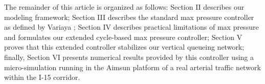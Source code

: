 


The remainder of this article is organized as follows: Section II describes our modeling framework; Section III describes the standard max pressure controller as defined by Variaya \cite{MaxPressureStochastic}; Section IV describes practical limitations of max pressure and formulates our extended cycle-based max pressure controller; Section V proves that this extended controller stabilizes our vertical queueing network; finally, Section VI presents numerical results provided by this controller using a micro-simulation running in the Aimsun platform of a real arterial traffic network within the I-15 corridor. %


%
%


